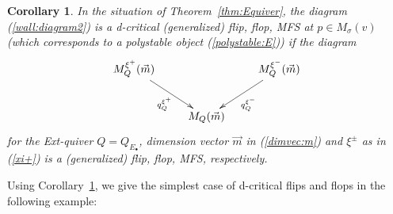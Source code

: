 \documentclass[11pt]{amsart}
\theoremstyle{plain}
\newtheorem{cor}[thm]{Corollary}
\theoremstyle{definition}
\theoremstyle{remark}
\begin{document}
\begin{cor}\label{cor:analytic}
In the situation of Theorem~\ref{thm:Equiver}, the diagram 
(\ref{wall:diagram2})
is a d-critical (generalized) flip, flop, MFS 
at $p\in M_{\sigma}(v)$ 
(which corresponds to a polystable object (\ref{polystable:E}))
if the diagram
\begin{align}\label{dia:qflip3}
\xymatrix{
M_Q^{\xi^+}(\vec{m}) \ar[rd]_-{q_{Q}^{\xi^+}} & & 
\ar[ld]^-{q_{Q}^{\xi^-}}
M_Q^{\xi^-}(\vec{m}) \\
& M_Q(\vec{m}) &
}
\end{align}
for the Ext-quiver $Q=Q_{E_{\bullet}}$, 
dimension vector $\vec{m}$ in (\ref{dimvec:m})
and $\xi^{\pm}$ as in (\ref{xi+}) is 
a (generalized) flip, flop, MFS, respectively. 
\end{cor}

Using Corollary~\ref{cor:analytic}, 
we give the simplest case of d-critical flips
and
flops in the following example: 
\end{document}
